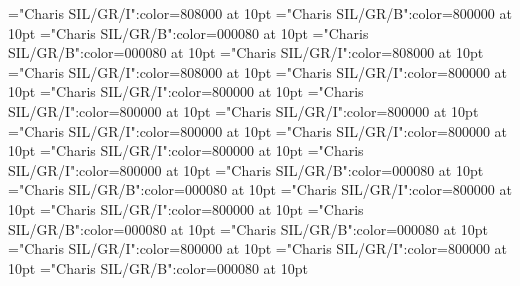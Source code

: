 \documentclass[a4paper,twoside]{article}
\begin{document}
\font\scientificnamesensesensecontentsensesmainentrycomplex="Charis SIL/GR/I":color=808000 at 10pt
\font\sensenumbersensecontentsensessensesensecontentsensesmainentrycomplex="Charis SIL/GR/B":color=800000 at 10pt
\font\spanmxbexampleexamplescontentssensesensecontentsensesmainentrycomplex="Charis SIL/GR/B":color=000080 at 10pt
\font\spanexampleexamplescontentssensesensecontentsensesmainentrycomplex="Charis SIL/GR/B":color=000080 at 10pt
\font\spanesencyclopedicinfosensesensecontentsensesmainentrycomplex="Charis SIL/GR/I":color=808000 at 10pt
\font\spanencyclopedicinfosensesensecontentsensesmainentrycomplex="Charis SIL/GR/I":color=808000 at 10pt
\font\spanesreverseabbrcomplexformtypescomplexformentryrefsmainentrycomplex="Charis SIL/GR/I":color=800000 at 10pt
\font\spanreverseabbrcomplexformtypescomplexformentryrefsmainentrycomplex="Charis SIL/GR/I":color=800000 at 10pt
\font\spanmxbheadwordreferencedentryreferencedentriescomplexformentryrefsmainentrycomplex="Charis SIL/GR/I":color=800000 at 10pt
\font\spanheadwordreferencedentryreferencedentriescomplexformentryrefsmainentrycomplex="Charis SIL/GR/I":color=800000 at 10pt
\font\spanescommentmainentrycomplex="Charis SIL/GR/I":color=800000 at 10pt
\font\spancommentmainentrycomplex="Charis SIL/GR/I":color=800000 at 10pt
\font\spanesabbreviationvariantentrytypevariantentrytypesvariantformentrybackrefsmainentrycomplex="Charis SIL/GR/I":color=800000 at 10pt
\font\spanabbreviationvariantentrytypevariantentrytypesvariantformentrybackrefsmainentrycomplex="Charis SIL/GR/I":color=800000 at 10pt
\font\spanmxbheadwordvariantformentrybackrefvariantformentrybackrefsmainentrycomplex="Charis SIL/GR/B":color=000080 at 10pt
\font\spanheadwordvariantformentrybackrefvariantformentrybackrefsmainentrycomplex="Charis SIL/GR/B":color=000080 at 10pt
\font\spanesabbreviationvariantentrytypevariantentrytypesvariantformentrybackrefsbmainentrycomplex="Charis SIL/GR/I":color=800000 at 10pt
\font\spanabbreviationvariantentrytypevariantentrytypesvariantformentrybackrefsbmainentrycomplex="Charis SIL/GR/I":color=800000 at 10pt
\font\spanmxbheadwordvariantformentrybackrefbvariantformentrybackrefsbmainentrycomplex="Charis SIL/GR/B":color=000080 at 10pt
\font\spanheadwordvariantformentrybackrefbvariantformentrybackrefsbmainentrycomplex="Charis SIL/GR/B":color=000080 at 10pt
\font\spanesownertypeabbreviationminimallexreferenceminimallexreferencesmainentrycomplex="Charis SIL/GR/I":color=800000 at 10pt
\font\spanownertypeabbreviationminimallexreferenceminimallexreferencesmainentrycomplex="Charis SIL/GR/I":color=800000 at 10pt
\font\spanmxbheadwordconfigtargetconfigtargetsminimallexreferenceminimallexreferencesmainentrycomplex="Charis SIL/GR/B":color=000080 at 10pt
\end{document}
